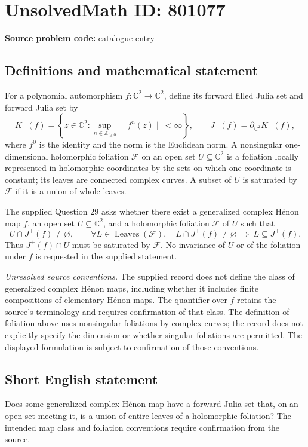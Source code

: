 \documentclass[11pt]{article}
\newcommand{\Z}{\mathbb{Z}}
\newcommand{\C}{\mathbb{C}}
\begin{document}
\section*{UnsolvedMath ID: 801077}
\textbf{Source problem code:} catalogue entry
\subsection{Definitions and mathematical statement}
For a polynomial automorphism \(f\colon\C^2\to\C^2\), define its forward filled Julia set and forward Julia set by
\[
K^+(f)=\left\{z\in\C^2:\sup_{n\in\Z_{\geq 0}}\|f^n(z)\|<\infty\right\},\qquad J^+(f)=\partial_{\C^2}K^+(f),
\]
where \(f^0\) is the identity and the norm is the Euclidean norm. A nonsingular one-dimensional holomorphic foliation \(\mathcal F\) on an open set \(U\subseteq\C^2\) is a foliation locally represented in holomorphic coordinates by the sets on which one coordinate is constant; its leaves are connected complex curves. A subset of \(U\) is saturated by \(\mathcal F\) if it is a union of whole leaves.

The supplied Question 29 asks whether there exist a generalized complex H\'enon map \(f\), an open set \(U\subseteq\C^2\), and a holomorphic foliation \(\mathcal F\) of \(U\) such that
\[
U\cap J^+(f)\neq\varnothing,
\qquad
\forall L\in\operatorname{Leaves}(\mathcal F),\quad
L\cap J^+(f)\neq\varnothing\ \Longrightarrow\ L\subseteq J^+(f).
\]
Thus \(J^+(f)\cap U\) must be saturated by \(\mathcal F\). No invariance of \(U\) or of the foliation under \(f\) is requested in the supplied statement.

\emph{Unresolved source conventions.} The supplied record does not define the class of generalized complex H\'enon maps, including whether it includes finite compositions of elementary H\'enon maps. The quantifier over \(f\) retains the source's terminology and requires confirmation of that class. The definition of foliation above uses nonsingular foliations by complex curves; the record does not explicitly specify the dimension or whether singular foliations are permitted. The displayed formulation is subject to confirmation of those conventions.
\subsection{Short English statement}
Does some generalized complex H\'enon map have a forward Julia set that, on an open set meeting it, is a union of entire leaves of a holomorphic foliation? The intended map class and foliation conventions require confirmation from the source.
\end{document}
